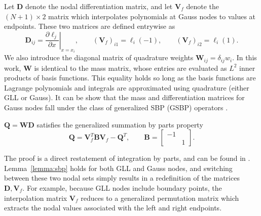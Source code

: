 \documentclass[review,onefignum,onetabnum,final]{siamart171218}
\newcommand{\pd}[2]{\frac{\partial#1}{\partial#2}}
\newcommand{\LRp}[1]{\left( #1 \right)}
\newcommand{\LRl}[1]{\left. #1 \right|}
\begin{document}
Let $\bm{D}$ denote the nodal differentiation matrix, and let $\bm{V}_f$ denote the $(N+1)\times 2$ matrix which interpolates polynomials at Gauss nodes to values at endpoints.  These two matrices are defined entrywise as
\[
\bm{D}_{ij} = \LRl{\pd{\ell_j}{x}}_{x = x_i}, \qquad \LRp{\bm{V}_f}_{i1} = \ell_i(-1), \qquad  \LRp{\bm{V}_f}_{i2} = \ell_i(1).
\]
We also introduce the diagonal matrix of quadrature weights $\bm{W}_{ij} = \delta_{ij} w_i$.  In this work, $\bm{W}$ is identical to the mass matrix, whose entries are evaluated as $L^2$ inner products of basis functions.  This equality holds so long as the basis functions are Lagrange polynomials and integrals are approximated using quadrature (either GLL or Gauss).  
It can be show that the mass and differentiation matrices for Gauss nodes fall under the class of generalized SBP (GSBP) operators \cite{fernandez2014generalized}.  
\begin{lemma}
\label{lemma:sbp}
$\bm{Q} = \bm{W}\bm{D}$ satisfies the generalized summation by parts property
\[
\bm{Q} = \bm{V}_f^T \bm{B} \bm{V}_f - \bm{Q}^T, \qquad \bm{B} = \begin{bmatrix}-1 & \\ & 1\end{bmatrix}.
\]
\end{lemma}
The proof is a direct restatement of integration by parts, and can be found in \cite{ortleb2016kinetic, ortleb2017kinetic, ranocha2018generalised}.  
Lemma~\ref{lemma:sbp} holds for both GLL and Gauss nodes, and switching between these two nodal sets simply results in a redefinition of the matrices $\bm{D}, \bm{V}_f$.  For example, because GLL nodes include boundary points, the interpolation matrix $\bm{V}_f$ reduces to a generalized permutation matrix which extracts the nodal values associated with the left and right endpoints.  %
\end{document}
